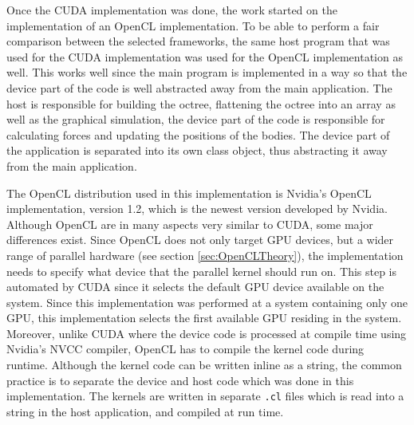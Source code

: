 Once the CUDA implementation was done, the work started on the implementation of an OpenCL implementation. To be able to perform a fair comparison between the selected frameworks, the same host program that was used for the CUDA implementation was used for the OpenCL implementation as well. This works well since the main program is implemented in a way so that the device part of the code is well abstracted away from the main application. The host is responsible for building the octree, flattening the octree into an array as well as the graphical simulation, the device part of the code is responsible for calculating forces and updating the positions of the bodies. The device part of the application is separated into its own class object, thus abstracting it away from the main application. 

The OpenCL distribution used in this implementation is Nvidia's OpenCL implementation, version 1.2, which is the newest version developed by Nvidia. 
Although OpenCL are in many aspects very similar to CUDA, some major differences exist. Since OpenCL does not only target GPU devices, but a wider range of parallel hardware (see section \ref{sec:OpenCLTheory}), the implementation needs to specify what device that the parallel kernel should run on. This step is automated by CUDA since it selects the default GPU device available on the system. Since this implementation was performed at a system containing only one GPU, this implementation selects the first available GPU residing in the system. Moreover, unlike CUDA where the device code is processed at compile time using Nvidia's NVCC compiler, OpenCL has to compile the kernel code during runtime. Although the kernel code can be written inline as a string, the common practice is to separate the device and host code which was done in this implementation. The kernels are written in separate \lstinline{.cl} files which is read into a string in the host application, and compiled at run time.

